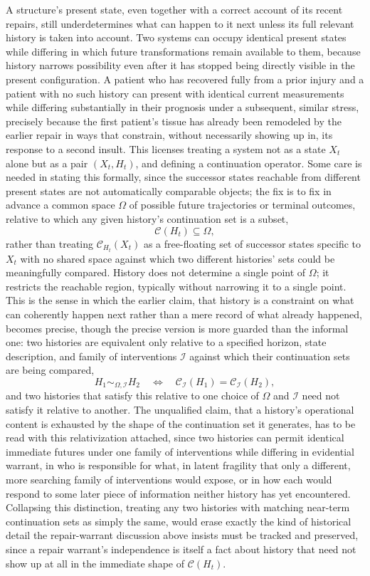 \documentclass[11pt]{article}
\begin{document}
A structure's present state, even together with a correct account of its recent repairs, still underdetermines what can happen to it next unless its full relevant history is taken into account. Two systems can occupy identical present states while differing in which future transformations remain available to them, because history narrows possibility even after it has stopped being directly visible in the present configuration. A patient who has recovered fully from a prior injury and a patient with no such history can present with identical current measurements while differing substantially in their prognosis under a subsequent, similar stress, precisely because the first patient's tissue has already been remodeled by the earlier repair in ways that constrain, without necessarily showing up in, its response to a second insult. This licenses treating a system not as a state $X_t$ alone but as a pair $(X_t, H_t)$, and defining a continuation operator. Some care is needed in stating this formally, since the successor states reachable from different present states are not automatically comparable objects; the fix is to fix in advance a common space $\Omega$ of possible future trajectories or terminal outcomes, relative to which any given history's continuation set is a subset,
$$\mathcal{C}(H_t) \subseteq \Omega,$$
rather than treating $\mathcal{C}_{H_t}(X_t)$ as a free-floating set of successor states specific to $X_t$ with no shared space against which two different histories' sets could be meaningfully compared. History does not determine a single point of $\Omega$; it restricts the reachable region, typically without narrowing it to a single point. This is the sense in which the earlier claim, that history is a constraint on what can coherently happen next rather than a mere record of what already happened, becomes precise, though the precise version is more guarded than the informal one: two histories are equivalent only relative to a specified horizon, state description, and family of interventions $\mathcal{I}$ against which their continuation sets are being compared,
$$H_1 \sim_{\Omega, \mathcal{I}} H_2 \quad \Longleftrightarrow \quad \mathcal{C}_{\mathcal{I}}(H_1) = \mathcal{C}_{\mathcal{I}}(H_2),$$
and two histories that satisfy this relative to one choice of $\Omega$ and $\mathcal{I}$ need not satisfy it relative to another. The unqualified claim, that a history's operational content is exhausted by the shape of the continuation set it generates, has to be read with this relativization attached, since two histories can permit identical immediate futures under one family of interventions while differing in evidential warrant, in who is responsible for what, in latent fragility that only a different, more searching family of interventions would expose, or in how each would respond to some later piece of information neither history has yet encountered. Collapsing this distinction, treating any two histories with matching near-term continuation sets as simply the same, would erase exactly the kind of historical detail the repair-warrant discussion above insists must be tracked and preserved, since a repair warrant's independence is itself a fact about history that need not show up at all in the immediate shape of $\mathcal{C}(H_t)$.
\end{document}
